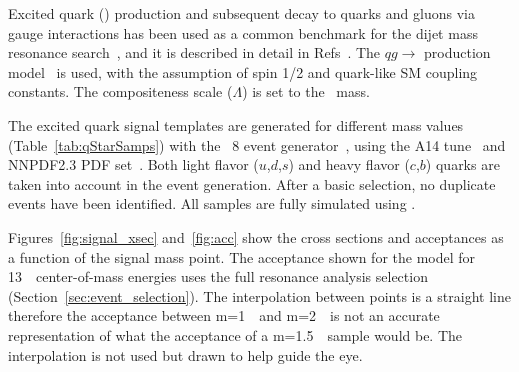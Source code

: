 Excited quark (\qstar) production and subsequent decay to
quarks and gluons via gauge interactions has been
used as a common benchmark for the dijet mass resonance
search~\cite{EXOT-2010-01,EXOT-2010-02,EXOT-2010-07,EXOT-2011-07,EXOT-2013-11,EXOT-2016-21},
and it is described in detail in Refs~\cite{Baur:1987ga,Baur:1989kv}.
The $qg\to$ \qstar production model~\cite{Baur:1987ga,Baur:1989kv} is used,
with the assumption of spin 1/2 and quark-like SM coupling constants.
The compositeness scale ($\Lambda$) is set to the \qstar~mass.

The excited quark signal templates are generated for different mass values
(Table~\ref{tab:qStarSamps}) with the \Pythia~8 event generator~\cite{pythia8},
using the A14 tune~\cite{A14tune} and NNPDF2.3 PDF set~\cite{Carrazza:2013axa}. Both light flavor ($u$,$d$,$s$) and heavy flavor ($c$,$b$) quarks are taken into account in
the event generation.
After a basic selection, no duplicate events have been identified.
All samples are fully simulated using \Geant.


Figures~\ref{fig:signal_xsec} and~\ref{fig:acc} show the cross sections and
acceptances as a function of the signal mass point.  
The acceptance shown for the \qstar model for 13~\TeV~center-of-mass energies 
uses the full resonance analysis selection (Section~\ref{sec:event_selection}).
The interpolation between points is a straight line therefore the
acceptance between m=1~\TeV~and m=2~\TeV~is not an accurate representation
of what the acceptance of a m=1.5~\TeV~sample would be.  The
interpolation is not used but drawn to help guide the eye.

